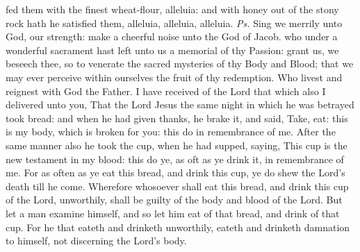 

\introit
{} fed them with the finest wheat-flour, alleluia: and with honey out of the stony rock hath he satisfied them, alleluia, alleluia, alleluia. \textit{Ps.} Sing we merrily unto God, our strength: make a cheerful noise unto the God of Jacob.
\collect
{} who under a wonderful sacrament hast left unto us a memorial of thy Passion: grant us, we beseech thee, so to venerate the sacred mysteries of thy Body and Blood; that we may ever perceive within ourselves the fruit of thy redemption. Who livest and reignest with God the Father.
 I have received of the Lord that which also I delivered unto you, That the Lord Jesus the same night in which he was betrayed took bread: and when he had given thanks, he brake it, and said, Take, eat: this is my body, which is broken for you: this do in remembrance of me. After the same manner also he took the cup, when he had supped, saying, This cup is the new testament in my blood: this do ye, as oft as ye drink it, in remembrance of me. For as often as ye eat this bread, and drink this cup, ye do shew the Lord's death till he come. Wherefore whosoever shall eat this bread, and drink this cup of the Lord, unworthily, shall be guilty of the body and blood of the Lord. But let a man examine himself, and so let him eat of that bread, and drink of that cup. For he that eateth and drinketh unworthily, eateth and drinketh damnation to himself, not discerning the Lord's body.

